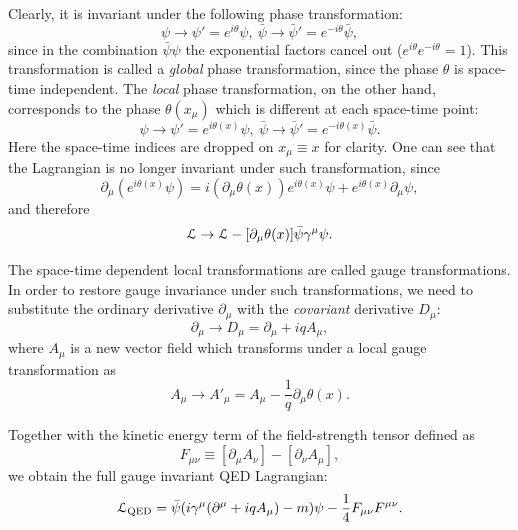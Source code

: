 Clearly, it is invariant under the following phase transformation:
\begin{equation}
\psi \rightarrow \psi' = e^{i \theta} \psi, ~\bar{\psi} \rightarrow \bar{\psi}' = e^{-i \theta} \bar{\psi},
\end{equation}
since in the combination $\bar{\psi}\psi$ the exponential factors cancel out ($e^{i \theta} e^{-i \theta} = 1$). This
transformation is called a \textit{global} phase transformation, since the phase $\theta$ is space-time independent.
The \textit{local} phase transformation, on the other hand, corresponds to the phase $\theta(x_\mu)$ which is
different at each space-time point:
\begin{equation}
\psi \rightarrow \psi' = e^{i \theta(x)} \psi, ~\bar{\psi} \rightarrow \bar{\psi}' = e^{-i \theta(x)} \bar{\psi}.
\end{equation}
Here the space-time indices are dropped on $x_\mu \equiv x$ for clarity. One can see that the Lagrangian is no longer
invariant under such transformation, since
\begin{equation}
\partial_\mu (e^{i \theta(x)} \psi) = i (\partial_\mu \theta(x))  e^{i \theta(x)} \psi + e^{i \theta(x)} \partial_\mu \psi,
\end{equation}
and therefore
\begin{equation}
\mathcal{L} \rightarrow \mathcal{L} - [\partial_\mu \theta(x)] \bar{\psi} \gamma^\mu \psi.
\end{equation}

The space-time dependent local transformations are called gauge transformations. In order to restore gauge invariance
under such transformations, we need to substitute the ordinary derivative $\partial_\mu$ with the \textit{covariant}
derivative $D_\mu$:
\begin{equation}
\partial_\mu \rightarrow D_\mu = \partial_\mu + i q A_\mu,
\end{equation}
where $A_\mu$ is a new vector field which transforms under a local gauge transformation as
\begin{equation}
A_\mu \rightarrow A'_\mu = A_\mu - \frac{1}{q} \partial_\mu \theta(x).
\end{equation}

Together with the kinetic energy term of the field-strength tensor defined as
\begin{equation}
\label{eq:F_mu_nu}
F_{\mu\nu} \equiv [\partial_\mu A_\nu] - [\partial_\nu A_\mu],
\end{equation}
we obtain the full gauge invariant QED Lagrangian:
\begin{equation}
\mathcal{L}_\textrm{QED} = \bar{\psi}(i \gamma^\mu (\partial^\mu + i q A_\mu) - m) \psi - \frac{1}{4}F_{\mu\nu} F^{\mu\nu}.
\end{equation}

